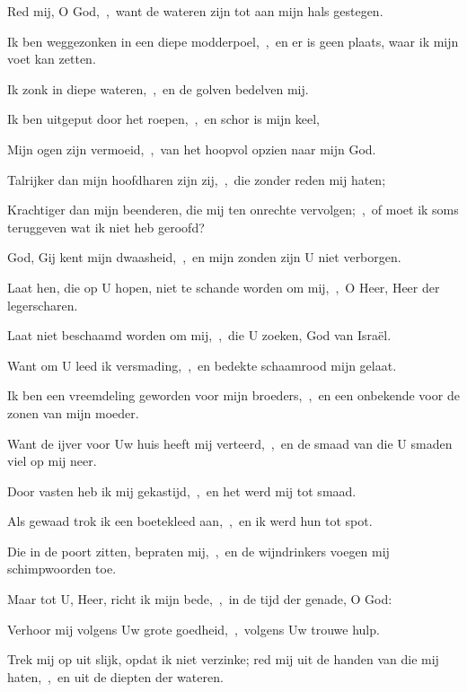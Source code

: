 \documentclass[12pt,twoside,a5paper]{article}
\begin{document}
\begin{halfparskip}

   Red mij, O God,~\sep\ want de wateren zijn tot aan mijn hals gestegen.

  Ik ben weggezonken in een diepe modderpoel,~\sep\ en er is geen plaats, waar ik mijn voet kan zetten.


  Ik zonk in diepe wateren,~\sep\ en de golven bedelven mij.

  Ik ben uitgeput door het roepen,~\sep\ en schor is mijn keel,

  Mijn ogen zijn vermoeid,~\sep\ van het hoopvol opzien naar mijn God.

  Talrijker dan mijn hoofdharen zijn zij,~\sep\ die zonder reden mij haten;

  Krachtiger dan mijn beenderen, die mij ten onrechte vervolgen;~\sep\ of moet ik soms teruggeven wat ik niet heb geroofd?

  God, Gij kent mijn dwaasheid,~\sep\ en mijn zonden zijn U niet verborgen.

  Laat hen, die op U hopen, niet te schande worden om mij,~\sep\ O Heer, Heer der legerscharen.

  Laat niet beschaamd worden om mij,~\sep\ die U zoeken, God van Israël.

  Want om U leed ik versmading,~\sep\ en bedekte schaamrood mijn gelaat.

  Ik ben een vreemdeling geworden voor mijn broeders,~\sep\ en een onbekende voor de zonen van mijn moeder.

  Want de ijver voor Uw huis heeft mij verteerd,~\sep\ en de smaad van die U smaden viel op mij neer.

  Door vasten heb ik mij gekastijd,~\sep\ en het werd mij tot smaad.

  Als gewaad trok ik een boetekleed aan,~\sep\ en ik werd hun tot spot.

  Die in de poort zitten, bepraten mij,~\sep\ en de wijndrinkers voegen mij schimpwoorden toe.

  Maar tot U, Heer, richt ik mijn bede,~\sep\ in de tijd der genade, O God:

  Verhoor mij volgens Uw grote goedheid,~\sep\ volgens Uw trouwe hulp.

  Trek mij op uit slijk, opdat ik niet verzinke; red mij uit de handen van die mij haten,~\sep\ en uit de diepten der wateren.


\end{halfparskip}
\end{document}
